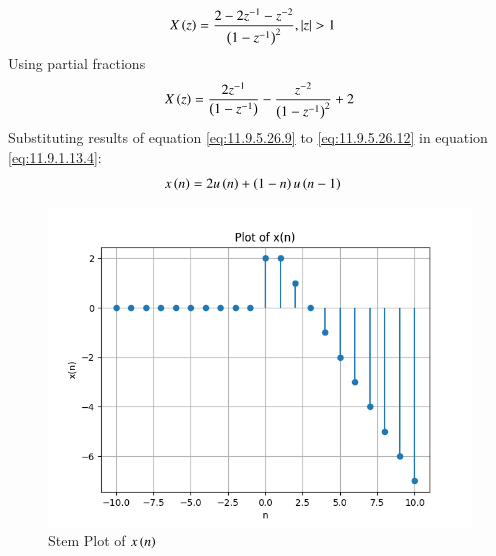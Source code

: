 \documentclass[journal,12pt,twocolumn]{IEEEtran}
\theoremstyle{remark}
\begin{document}
\begin{align}
    X\left(z\right) &= \frac{2-2z^{-1}-z^{-2}}{\left(1-z^{-1}\right)^2}  ,   \left\vert z\right\vert >1
\end{align}
Using partial fractions
\begin{align}
    X\left(z\right) &= \frac{2z^{-1}}{\left(1-z^{-1}\right)} - \frac{z^{-2}}{\left(1-z^{-1}\right)^2} + 2\label{eq:11.9.1.13.4}\\
\end{align}
Substituting results of equation \eqref{eq:11.9.5.26.9} to \eqref{eq:11.9.5.26.12} in equation \eqref{eq:11.9.1.13.4}:
\begin{align}
    x\left(n\right) &= 2u\left(n\right)+\left(1-n\right)u\left(n-1\right)
\end{align}
\begin{figure}[htbp]
    \centering
    \includegraphics[width=1\columnwidth]{figs/fig_x(n).png}
    \caption{Stem Plot of $x\left(n\right)$}
    \label{fig:x(n)}
\end{figure}
\end{document}
